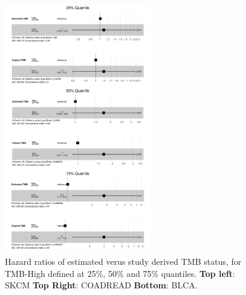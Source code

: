 \documentclass[12pt]{article}
\begin{document}
\begin{figure}[h]
    \includegraphics[width=2.5in]{results/figures/blca_forests.png}
    \caption{Hazard ratios of estimated verus study derived TMB status, for TMB-High defined at 25\%, 50\% and 75\% quantiles. \textbf{Top left}: SKCM \textbf{Top Right}: COADREAD \textbf{Bottom}: BLCA.}
    \label{fig:msk_forests}
\end{figure}
\end{document}
